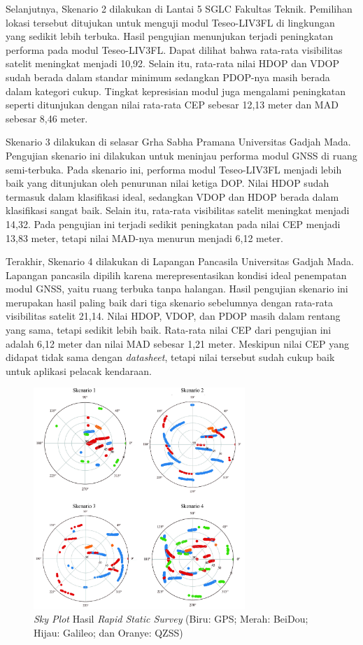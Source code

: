 \documentclass[conference]{IEEEtran}
\begin{document}
Selanjutnya, Skenario 2 dilakukan di Lantai 5 SGLC Fakultas Teknik. Pemilihan lokasi tersebut ditujukan untuk menguji modul Teseo-LIV3FL di lingkungan yang sedikit lebih terbuka. Hasil pengujian menunjukan terjadi peningkatan performa pada modul Teseo-LIV3FL. Dapat dilihat bahwa rata-rata visibilitas satelit meningkat menjadi 10,92. Selain itu, rata-rata nilai HDOP dan VDOP sudah berada dalam standar minimum sedangkan PDOP-nya masih berada dalam kategori cukup. Tingkat kepresisian modul juga mengalami peningkatan seperti ditunjukan dengan nilai rata-rata CEP sebesar 12,13 meter dan MAD sebesar 8,46 meter.

Skenario 3 dilakukan di selasar Grha Sabha Pramana Universitas Gadjah Mada. Pengujian skenario ini dilakukan untuk meninjau performa modul GNSS di ruang semi-terbuka. Pada skenario ini, performa modul Teseo-LIV3FL menjadi lebih baik yang ditunjukan oleh penurunan nilai ketiga DOP. Nilai HDOP sudah termasuk dalam klasifikasi ideal, sedangkan VDOP dan HDOP berada dalam klasifikasi sangat baik. Selain itu, rata-rata visibilitas satelit meningkat menjadi 14,32. Pada pengujian ini terjadi sedikit peningkatan pada nilai CEP menjadi 13,83 meter, tetapi nilai MAD-nya menurun menjadi 6,12 meter.

 Terakhir, Skenario 4 dilakukan di Lapangan Pancasila Universitas Gadjah Mada. Lapangan pancasila dipilih karena merepresentasikan kondisi ideal penempatan modul GNSS, yaitu ruang terbuka tanpa halangan. Hasil pengujian skenario ini merupakan hasil paling baik dari tiga skenario sebelumnya dengan rata-rata visibilitas satelit 21,14. Nilai HDOP, VDOP, dan PDOP masih dalam rentang yang sama, tetapi sedikit lebih baik. Rata-rata nilai CEP dari pengujian ini adalah 6,12 meter  dan nilai MAD sebesar 1,21 meter. Meskipun nilai CEP yang didapat tidak sama dengan \textit{datasheet}, tetapi nilai tersebut sudah cukup baik untuk aplikasi pelacak kendaraan.

\begin{figure}[hbt!]
	\centering
	\includegraphics[width=8cm]{skyplot.jpg}
	\caption{\textit{Sky Plot} Hasil \textit{Rapid Static Survey} (Biru: GPS; Merah: BeiDou; Hijau: Galileo; dan Oranye: QZSS)}
	\label{fig: 4-skyplot}
\end{figure}
\end{document}
